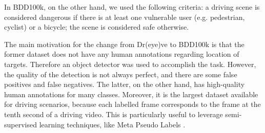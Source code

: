 In BDD100k, on the other hand, we used the following criteria: a driving scene 
is considered dangerous if there is at least one vulnerable user (e.g. pedestrian, 
cyclist) or a bicycle; the scene is considered safe otherwise.

The main motivation for the change from Dr(eye)ve to BDD100k is that the former 
dataset does not have any human annotations regarding location of targets. 
Therefore an object detector was used to accomplish the task. However, the 
quality of the detection is not always perfect, and there are some false 
positives and false negatives.
The latter, on the other hand, has high-quality human annotations for many 
classes. Moreover, it is the largest dataset available for driving scenarios, 
because each labelled frame corresponds to the frame at the tenth second of 
a driving video. This is particularly useful to leverage semi-supervised learning 
techniques, like Meta Pseudo Labels \cite{pham2021meta}.

